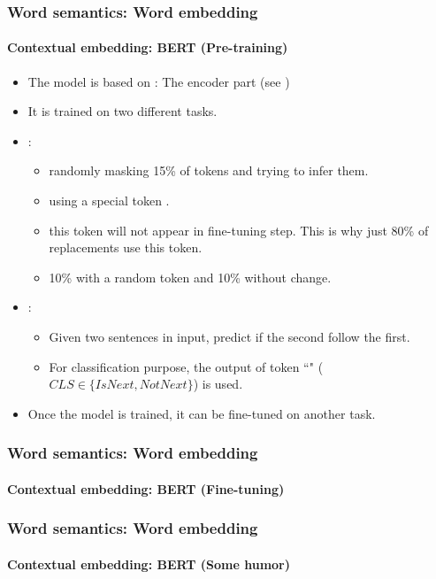 \documentclass[xcolor=table]{beamer}
\begin{document}
\begin{frame}
\frametitle{Word semantics: Word embedding}
\framesubtitle{Contextual embedding: BERT (Pre-training)}
	
\begin{itemize}
	\item The model is based on : The encoder part (see \cite{2017-vaswani-al})
	\item It is trained on two different tasks.
	\item {}:
	\begin{itemize}
		\item randomly masking 15\% of tokens and trying to infer them.
		\item using a special token \keyword{[MASK]}.
		\item this token will not appear in fine-tuning step.
		This is why just 80\% of replacements use this token.
		\item 10\% with a random token and 10\% without change. 
	\end{itemize}
	\item {}:
	\begin{itemize}
		\item Given two sentences in input, predict if the second follow the first. 
		\item For classification purpose, the output of token ``\keyword{[CLS]}" ($CLS \in \{IsNext, NotNext\}$) is used.
	\end{itemize}
	\item Once the model is trained, it can be fine-tuned on another task.
\end{itemize}
	
\end{frame}

\begin{frame}
\frametitle{Word semantics: Word embedding}
\framesubtitle{Contextual embedding: BERT (Fine-tuning)}

	\begin{center}
	\end{center}
	
\end{frame}

\begin{frame}
\frametitle{Word semantics: Word embedding}
\framesubtitle{Contextual embedding: BERT (Some humor)}

	\begin{center}
	\end{center}
	
\end{frame}
\end{document}
